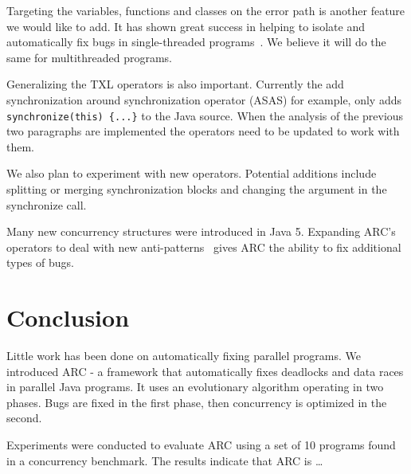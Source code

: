 \documentclass[10pt, conference, compsocconf]{IEEEtran}
\begin{document}
Targeting the variables, functions and classes on the error path is another
feature we would like to add.  It has shown great success in helping to isolate
and automatically fix bugs in single-threaded programs~\cite{FNWG09, NWLF09,
WFGN10, GNFW11}. We believe it will do the same for multithreaded programs.

Generalizing the TXL operators is also important. Currently the add
synchronization around synchronization operator (ASAS) for example, only adds
\texttt{synchronize(this) \{...\}} to the Java source.  When the analysis of
the previous two paragraphs are implemented the operators need to be updated to
work with them.

We also plan to experiment with new operators.  Potential additions include
splitting or merging synchronization blocks and changing the argument in the
synchronize call.

Many new concurrency structures were introduced in Java 5. Expanding ARC's
operators to deal with new anti-patterns~\cite{BJ09, BCD06} gives ARC the
ability to fix additional types of bugs.

\section{Conclusion}
\label{sec:conclusion}

Little work has been done on automatically fixing parallel programs.  We
introduced ARC - a framework that automatically fixes deadlocks and data
races in parallel Java programs. It uses an evolutionary
algorithm operating in two phases. Bugs are fixed in the first phase, then
concurrency is optimized in the second.

Experiments were conducted to evaluate ARC using a set of 10 programs found in
a concurrency benchmark. The results indicate that ARC is \ldots %







%

\end{document}

